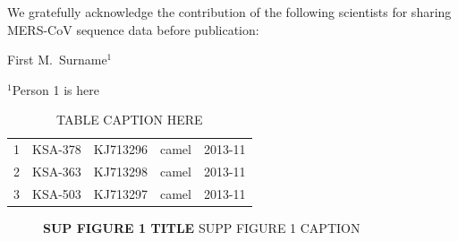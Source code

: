 \documentclass[11pt,oneside,letterpaper]{article}
\begin{document}
We gratefully acknowledge the contribution of the following scientists for sharing MERS-CoV sequence data before publication:

First M.\ Surname$^{1}$

$^{1}$Person 1 is here \\

% 
% 

\newpage


\setcounter{figure}{0}
\setcounter{table}{0}
\renewcommand{\thefigure}{S\arabic{figure}}
\renewcommand{\thetable}{S\arabic{table}}

\begin{longtable}{ | r | l | p{2cm} | l | l | } %

  \caption{TABLE CAPTION HERE} \label{TABLE LABEL HERE} \\
  \endfirsthead

  1 & KSA-378 & KJ713296 & camel & 2013-11 \\
  2 & KSA-363 & KJ713298 & camel & 2013-11 \\
  3 & KSA-503 & KJ713297 & camel & 2013-11 \\

\end{longtable}

\begin{figure}[h]
\centering
	\caption{\textbf{SUP FIGURE 1 TITLE }
SUPP FIGURE 1 CAPTION
	}
	\label{SUP_FIGURE_1_LABEL}
\end{figure}


%
%
%
\end{document}

